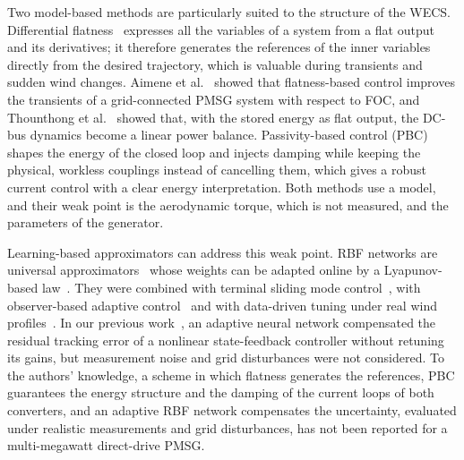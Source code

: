 \documentclass[11pt,a4paper]{article}
\begin{document}
Two model-based methods are particularly suited to the structure of the WECS. Differential
flatness~\cite{fliess1995} expresses all the variables of a system from a flat output and its
derivatives; it therefore generates the references of the inner variables directly from the desired
trajectory, which is valuable during transients and sudden wind changes. Aimene et al.~\cite{aimene2022}
showed that flatness-based control improves the transients of a grid-connected PMSG system with respect
to FOC, and Thounthong et al.~\cite{thounthong2010} showed that, with the stored energy as flat output,
the DC-bus dynamics become a linear power balance. Passivity-based control (PBC)~\cite{ortega1998,ortega2002}
shapes the energy of the closed loop and injects damping while keeping the physical, workless couplings
instead of cancelling them, which gives a robust current control with a clear energy interpretation.
Both methods use a model, and their weak point is the aerodynamic torque, which is not measured, and the
parameters of the generator.

Learning-based approximators can address this weak point. RBF networks are universal
approximators~\cite{park1991} whose weights can be adapted online by a Lyapunov-based
law~\cite{lewis1999,ioannou1996}. They were combined with terminal sliding mode control~\cite{li2024}, with
observer-based adaptive control~\cite{bounar2025} and with data-driven tuning under real wind
profiles~\cite{dardabi2024}. In our previous work~\cite{regani2026}, an adaptive neural network
compensated the residual tracking error of a nonlinear state-feedback controller without retuning its
gains, but measurement noise and grid disturbances were not considered. To the authors' knowledge, a
scheme in which flatness generates the references, PBC guarantees the energy structure and the damping of
the current loops of both converters, and an adaptive RBF network compensates the uncertainty, evaluated
under realistic measurements and grid disturbances, has not been reported for a multi-megawatt
direct-drive PMSG.
\end{document}
